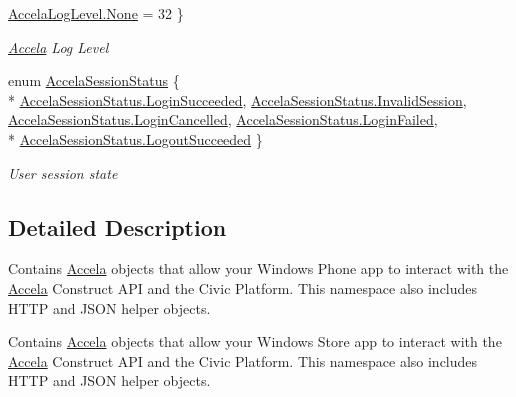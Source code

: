 \begin{DoxyCompactItemize}
\hyperlink{namespace_accela_1_1_windows_store_s_d_k_aaf389cdbcc309b77e2fabfcd0844454ba6adf97f83acf6453d4a6a4b1070f3754}{Accela\+Log\+Level.\+None} = 32
 \}
\begin{DoxyCompactList}\small\item\em \hyperlink{namespace_accela}{Accela} Log Level \end{DoxyCompactList}\item 
enum \hyperlink{namespace_accela_1_1_windows_store_s_d_k_a20db67946f939b9dc665320aff52e802}{Accela\+Session\+Status} \{ \\*
\hyperlink{namespace_accela_1_1_windows_store_s_d_k_a20db67946f939b9dc665320aff52e802a9bb58f8e77dd159f9a4f6a83c410af31}{Accela\+Session\+Status.\+Login\+Succeeded}, 
\hyperlink{namespace_accela_1_1_windows_store_s_d_k_a20db67946f939b9dc665320aff52e802a082b94968d127d17abb24a69da6cda56}{Accela\+Session\+Status.\+Invalid\+Session}, 
\hyperlink{namespace_accela_1_1_windows_store_s_d_k_a20db67946f939b9dc665320aff52e802afff3186c234b5fcc4d901968393213f2}{Accela\+Session\+Status.\+Login\+Cancelled}, 
\hyperlink{namespace_accela_1_1_windows_store_s_d_k_a20db67946f939b9dc665320aff52e802a6347e854fac7c2ce131527e32f2f8571}{Accela\+Session\+Status.\+Login\+Failed}, 
\\*
\hyperlink{namespace_accela_1_1_windows_store_s_d_k_a20db67946f939b9dc665320aff52e802ade8f89e24180053a6f894429eb1f8e3e}{Accela\+Session\+Status.\+Logout\+Succeeded}
 \}
\begin{DoxyCompactList}\small\item\em User session state \end{DoxyCompactList}\end{DoxyCompactItemize}


\subsection{Detailed Description}
Contains \hyperlink{namespace_accela}{Accela} objects that allow your Windows Phone app to interact with the \hyperlink{namespace_accela}{Accela} Construct A\+P\+I and the Civic Platform. This namespace also includes H\+T\+T\+P and J\+S\+O\+N helper objects. 

Contains \hyperlink{namespace_accela}{Accela} objects that allow your Windows Store app to interact with the \hyperlink{namespace_accela}{Accela} Construct A\+P\+I and the Civic Platform. This namespace also includes H\+T\+T\+P and J\+S\+O\+N helper objects. 

